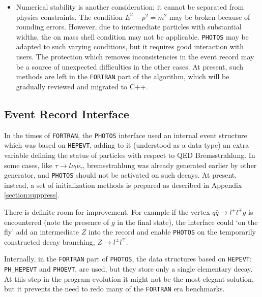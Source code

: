 \documentclass[]{Photos_interface_design}
\begin{document}
\begin{itemize}
\item
Numerical stability is another consideration; it cannot be separated from
physics constraints. The condition  $E^2-p^2=m^2$ may be broken  because of 
rounding errors.  However, due to intermediate particles with
  substantial widths, the on mass shell condition may not be applicable.
{\tt PHOTOS} may be adapted to such varying conditions, but it requires
good interaction with users. The protection which removes 
inconsistencies in the event record may be a source of unexpected difficulties
in the other cases. 
At present, such methods are left in the {\tt FORTRAN} part of the algorithm, 
which
will be gradually reviewed and  migrated to C++.
\end{itemize}

 
\subsection{Event Record Interface}
In the times of {\tt FORTRAN}, the {\tt PHOTOS} interface used an internal event structure which was
based on {\tt HEPEVT},
adding to it (understood as a data type) an extra variable defining 
the status of particles with respect to QED Bremsstrahlung. In some cases, like
$\tau \to l \nu_l \nu_\tau$, bremsstrahlung was already generated earlier
by other generator, and {\tt PHOTOS} should not be activated on such decays.
At present, instead, a set of initialization methods is 
prepared as described in Appendix \ref{section:suppress}. 

There is definite room for 
improvement. For example if the vertex $q \bar q \to l^\pm l^\mp g$ is encountered
(note the presence of $g$ in the final state),
the interface could `on the fly' add an intermediate $Z$ into the record and enable {\tt PHOTOS}
on the temporarily constructed decay branching, $Z \to l^\pm l^\mp $. 

Internally, in the {\tt FORTRAN} part of {\tt PHOTOS}, the data
structures based on {\tt HEPEVT}: {\tt PH\_HEPEVT} and {\tt PHOEVT}, 
are used, but they store only a single elementary decay. 
At this step in the program
evolution it might not be the most elegant solution, but it prevents
the need to redo many of the {\tt FORTRAN} era benchmarks.
\end{document}
